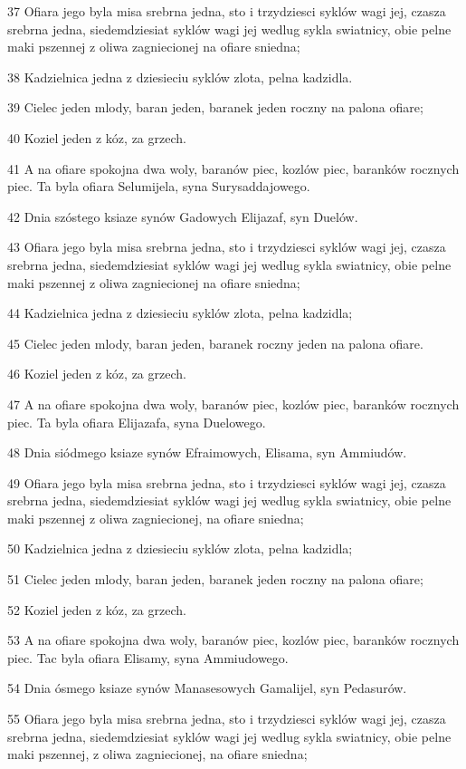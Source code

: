 \par 37 Ofiara jego byla misa srebrna jedna, sto i trzydziesci syklów wagi jej, czasza srebrna jedna, siedemdziesiat syklów wagi jej wedlug sykla swiatnicy, obie pelne maki pszennej z oliwa zagniecionej na ofiare sniedna;
\par 38 Kadzielnica jedna z dziesieciu syklów zlota, pelna kadzidla.
\par 39 Cielec jeden mlody, baran jeden, baranek jeden roczny na palona ofiare;
\par 40 Koziel jeden z kóz, za grzech.
\par 41 A na ofiare spokojna dwa woly, baranów piec, kozlów piec, baranków rocznych piec. Ta byla ofiara Selumijela, syna Surysaddajowego.
\par 42 Dnia szóstego ksiaze synów Gadowych Elijazaf, syn Duelów.
\par 43 Ofiara jego byla misa srebrna jedna, sto i trzydziesci syklów wagi jej, czasza srebrna jedna, siedemdziesiat syklów wagi jej wedlug sykla swiatnicy, obie pelne maki pszennej z oliwa zagniecionej na ofiare sniedna;
\par 44 Kadzielnica jedna z dziesieciu syklów zlota, pelna kadzidla;
\par 45 Cielec jeden mlody, baran jeden, baranek roczny jeden na palona ofiare.
\par 46 Koziel jeden z kóz, za grzech.
\par 47 A na ofiare spokojna dwa woly, baranów piec, kozlów piec, baranków rocznych piec. Ta byla ofiara Elijazafa, syna Duelowego.
\par 48 Dnia siódmego ksiaze synów Efraimowych, Elisama, syn Ammiudów.
\par 49 Ofiara jego byla misa srebrna jedna, sto i trzydziesci syklów wagi jej, czasza srebrna jedna, siedemdziesiat syklów wagi jej wedlug sykla swiatnicy, obie pelne maki pszennej z oliwa zagniecionej, na ofiare sniedna;
\par 50 Kadzielnica jedna z dziesieciu syklów zlota, pelna kadzidla;
\par 51 Cielec jeden mlody, baran jeden, baranek jeden roczny na palona ofiare;
\par 52 Koziel jeden z kóz, za grzech.
\par 53 A na ofiare spokojna dwa woly, baranów piec, kozlów piec, baranków rocznych piec. Tac byla ofiara Elisamy, syna Ammiudowego.
\par 54 Dnia ósmego ksiaze synów Manasesowych Gamalijel, syn Pedasurów.
\par 55 Ofiara jego byla misa srebrna jedna, sto i trzydziesci syklów wagi jej, czasza srebrna jedna, siedemdziesiat syklów wagi jej wedlug sykla swiatnicy, obie pelne maki pszennej, z oliwa zagniecionej, na ofiare sniedna;
